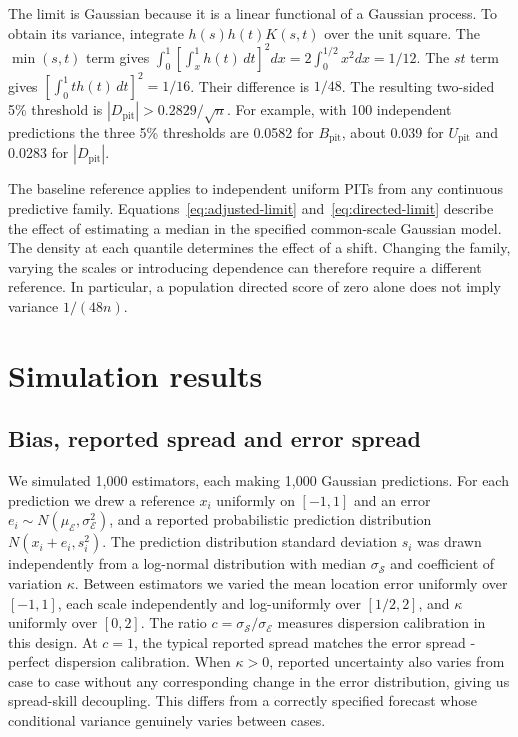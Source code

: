 \documentclass[twoside,11pt,hyphens]{article}
\newcommand{\Bpit}{B_{\mathrm{pit}}}
\newcommand{\Dpit}{D_{\mathrm{pit}}}
\newcommand{\Upit}{U_{\mathrm{pit}}}
\begin{document}
The limit is Gaussian because it is a linear functional of a Gaussian process. To obtain its variance, integrate $h(s)h(t)K(s,t)$ over the unit square. The $\min(s,t)$ term gives $\int_0^1[\int_x^1 h(t)\,dt]^2dx=2\int_0^{1/2}x^2dx=1/12$. The $st$ term gives $[\int_0^1 t h(t)\,dt]^2=1/16$. Their difference is $1/48$. The resulting two-sided 5\% threshold is $|\Dpit|>0.2829/\sqrt n$. For example, with 100 independent predictions the three 5\% thresholds are 0.0582 for $\Bpit$, about 0.039 for $\Upit$ and 0.0283 for $|\Dpit|$.

The baseline reference applies to independent uniform PITs from any continuous predictive family. Equations~\eqref{eq:adjusted-limit} and~\eqref{eq:directed-limit} describe the effect of estimating a median in the specified common-scale Gaussian model. The density at each quantile determines the effect of a shift. Changing the family, varying the scales or introducing dependence can therefore require a different reference. In particular, a population directed score of zero alone does not imply variance $1/(48n)$.

\section{Simulation results}
\label{sec:simulation}

\subsection{Bias, reported spread and error spread}

We simulated 1,000 estimators, each making 1,000 Gaussian predictions. For each prediction we drew a reference $x_i$ uniformly on $[-1,1]$ and an error $e_i\sim N(\mu_{\mathcal E},\sigma_{\mathcal E}^2)$, and a reported probabilistic prediction distribution $N(x_i+e_i,s_i^2)$. The prediction distribution standard deviation $s_i$ was drawn independently from a log-normal distribution with median $\sigma_{\mathcal S}$ and coefficient of variation $\kappa$. Between estimators we varied the mean location error uniformly over $[-1,1]$, each scale independently and log-uniformly over $[1/2,2]$, and $\kappa$ uniformly over $[0,2]$. The ratio $c=\sigma_{\mathcal S}/\sigma_{\mathcal E}$ measures dispersion calibration in this design. At $c=1$, the typical reported spread matches the error spread - perfect dispersion calibration. When $\kappa>0$, reported uncertainty also varies from case to case without any corresponding change in the error distribution, giving us spread-skill decoupling. This differs from a correctly specified forecast whose conditional variance genuinely varies between cases.
\end{document}
